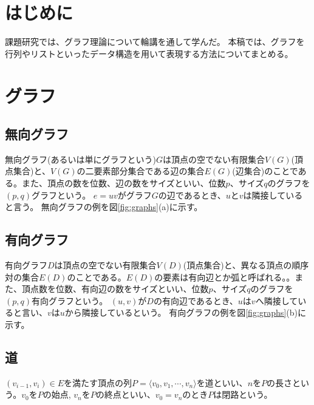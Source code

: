 \documentclass[dvipdfmx, twocolumn, 11pt]{jsarticle}
\begin{document}
 


\section{はじめに}
    課題研究では、グラフ理論について輪講を通して学んだ。
    本稿では、グラフを行列やリストといったデータ構造を用いて表現する方法についてまとめる。

\section{グラフ}
    \subsection{無向グラフ}
        無向グラフ(あるいは単にグラフという)$G$は頂点の空でない有限集合$V(G)$(頂点集合)と、$V(G)$の二要素部分集合である辺の集合$E(G)$(辺集合)のことである。また、頂点の数を位数、辺の数をサイズといい、位数$p$、サイズ$q$のグラフを$(p,q)$グラフという。
        $e = uv$がグラフ$G$の辺であるとき、$u$と$v$は隣接していると言う。
        無向グラフの例を図\ref{fig:graphs}(a)に示す。

    \subsection{有向グラフ}
        有向グラフ$D$は頂点の空でない有限集合$V(D)$(頂点集合)と、異なる頂点の順序対の集合$E(D)$のことである。$E(D)$の要素は有向辺とか弧と呼ばれる。。また、頂点数を位数、有向辺の数をサイズといい、位数$p$、サイズ$q$のグラフを$(p,q)$有向グラフという。
        $(u, v)$が$D$の有向辺であるとき、$u$は$v$へ隣接していると言い、$v$は$u$から隣接しているという。
        有向グラフの例を図\ref{fig:graphs}(b)に示す。

    
    \subsection{道}
        $(v_{i-1}, v_i) \in E$を満たす頂点の列$P = \langle v_0, v_1, \cdots, v_n \rangle$を道といい、$n$を$P$の長さという。$v_0$を$P$の始点, $v_n$を$P$の終点といい、$v_0 = v_n$のとき$P$は閉路という。
\end{document}
